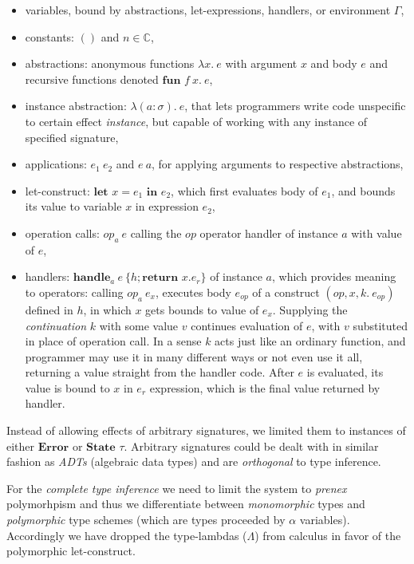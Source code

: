 \documentclass[declaration,shortabstract]{iithesis}
\theoremstyle{definition} \newtheorem{definition}{Definition}[section]
\newcommand{\lam}[1][x]{\ensuremath{\lambda #1.\:}}
\begin{document}
\begin{itemize}
    \item variables, bound by abstractions, let-expressions, handlers, or environment $\Gamma$,
    \item constants: $()$ and $n \in \mathbb{C}$,
    \item abstractions: anonymous functions $\lam e$ with argument $x$ and body $e$ and recursive functions denoted $\textbf{fun }f\:x.\:e$,
    \item instance abstraction: $\lam[(a:\sigma)]e$, that lets programmers write code
    unspecific to certain effect \textit{instance}, but capable of working with any
    instance of specified signature,
    \item applications: $e_1\:e_2$ and $e\:a$, for applying arguments to respective abstractions, 
    \item let-construct: $\textbf{let } x = e_1 \textbf{ in } e_2$, which first evaluates body of $e_1$,
    and bounds its value to variable $x$ in expression $e_2$,
    \item operation calls: $op_a\:e$ calling the $op$ operator handler of instance $a$ with value
    of $e$,
    \item handlers: $\textbf{handle}_a \: e\: \{h;\textbf{return } x. e_r\}$ of instance $a$, 
    which provides meaning to operators: calling $op_a\:e_x$, executes body $e_{op}$ of
    a construct $(op, x, k.\:e_{op})$ defined in $h$, in which $x$ gets bounds to value of $e_x$.
    Supplying the \textit{continuation} $k$ with some value $v$ continues evaluation of $e$,
    with $v$ substituted in place of operation call.
    In a sense $k$ acts just like an ordinary function, and programmer may use it
    in many different ways or not even use it all, returning a value straight from the handler code.
    After $e$ is evaluated, its value is bound to $x$ in $e_r$ expression,
    which is the final value returned by handler.

\end{itemize}

Instead of allowing effects of arbitrary signatures, we limited them to instances
of either $\textbf{Error}$ or  $\textbf{State }\tau$.
Arbitrary signatures could be dealt with in similar fashion as \textit{ADTs}
(algebraic data types) and are \textit{orthogonal} to type inference.

For the \textit{complete type inference} we need to limit the system to \textit{prenex}
polymorhpism and thus we differentiate between \textit{monomorphic} types and \textit{polymorphic}
type schemes (which are types proceeded by $\alpha$ variables).
Accordingly we have dropped the type-lambdas ($\Lambda$) from calculus in favor of the
polymorphic let-construct.
\end{document}
